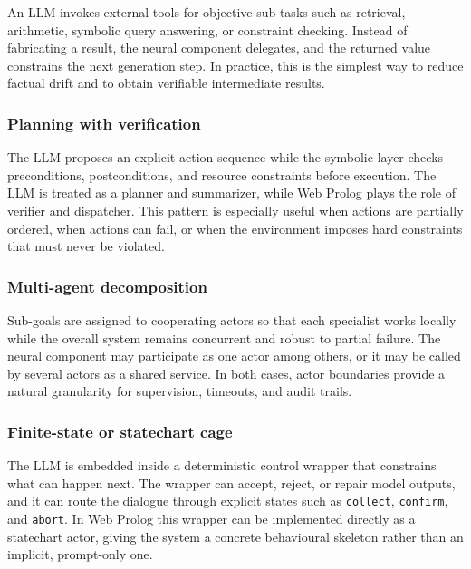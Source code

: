 An LLM invokes external tools for objective sub-tasks such as retrieval, arithmetic, symbolic query answering, or constraint checking. Instead of fabricating a result, the neural component delegates, and the returned value constrains the next generation step. In practice, this is the simplest way to reduce factual drift and to obtain verifiable intermediate results.

\subsubsection{Planning with verification}

The LLM proposes an explicit action sequence while the symbolic layer checks preconditions, postconditions, and resource constraints before execution. The LLM is treated as a planner and summarizer, while Web Prolog plays the role of verifier and dispatcher. This pattern is especially useful when actions are partially ordered, when actions can fail, or when the environment imposes hard constraints that must never be violated.

\subsubsection{Multi-agent decomposition}

Sub-goals are assigned to cooperating actors so that each specialist works locally while the overall system remains concurrent and robust to partial failure. The neural component may participate as one actor among others, or it may be called by several actors as a shared service. In both cases, actor boundaries provide a natural granularity for supervision, timeouts, and audit trails.

\subsubsection{Finite-state or statechart cage}

The LLM is embedded inside a deterministic control wrapper that constrains what can happen next. The wrapper can accept, reject, or repair model outputs, and it can route the dialogue through explicit states such as \texttt{collect}, \texttt{confirm}, and \texttt{abort}. In Web Prolog this wrapper can be implemented directly as a statechart actor, giving the system a concrete behavioural skeleton rather than an implicit, prompt-only one.

